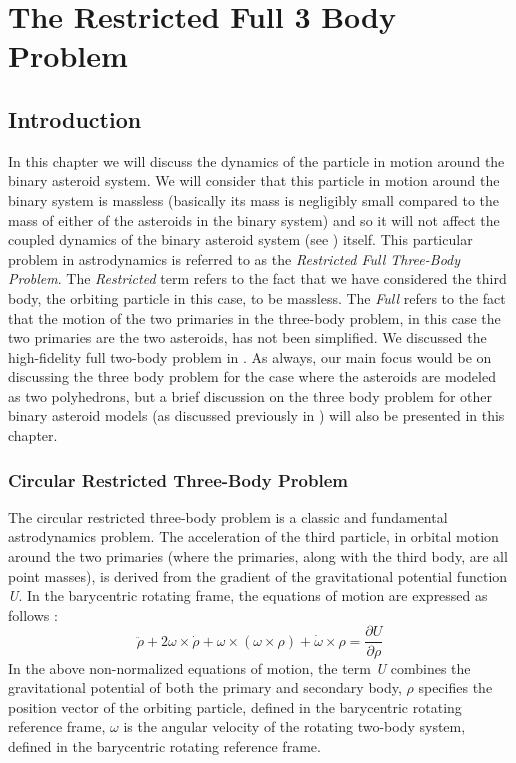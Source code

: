 \chapter{The Restricted Full 3 Body Problem}
\label{RF3BP}
\graphicspath{{chapter-5/Images/}}

\section{Introduction}
In this chapter we will discuss the dynamics of the particle in motion around the binary asteroid system. We will consider that this particle in motion around the binary system is massless (basically its mass is negligibly small compared to the mass of either of the asteroids in the binary system) and so it will not affect the coupled dynamics of the binary asteroid system (see ) itself. This particular problem in astrodynamics is referred to as the \textit{Restricted Full Three-Body Problem}. The \textit{Restricted} term refers to the fact that we have considered the third body, the orbiting particle in this case, to be massless. The \textit{Full} refers to the fact that the motion of the two primaries in the three-body problem, in this case the two primaries are the two asteroids, has not been simplified. We discussed the high-fidelity full two-body problem in . As always, our main focus would be on discussing the three body problem for the case where the asteroids are modeled as two polyhedrons, but a brief discussion on the three body problem for other binary asteroid models (as discussed previously in ) will also be presented in this chapter.

\subsection{Circular Restricted Three-Body Problem}
\label{CRTBP}
The circular restricted three-body problem is a classic and fundamental astrodynamics problem. The acceleration of the third particle, in orbital motion around the two primaries (where the primaries, along with the third body, are all point masses), is derived from the gradient of the gravitational potential function \textit{U}. In the barycentric rotating frame, the equations of motion are expressed as follows \cite{chappaz}:
\begin{equation}
\label{crtbp_eom}
\ddot{\rho} + 2\omega \times \dot{\rho} + \omega \times (\omega \times \rho) + \dot{\omega} \times \rho = \frac{\partial U}{\partial \rho}
\end{equation}
%
In the above non-normalized equations of motion, the term \textit{U} combines the gravitational potential of both the primary and secondary body, $\rho$ specifies the position vector of the orbiting particle, defined in the barycentric rotating reference frame, $\omega$ is the angular velocity of the rotating two-body system, defined in the barycentric rotating reference frame.

